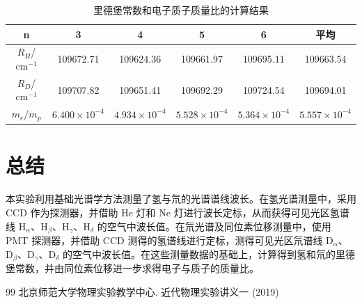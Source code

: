 \documentclass[a4paper, 1.5lines]{ctexart}
\begin{document}
    \begin{table}[h!]
        \centering
        \caption{里德堡常数和电子质子质量比的计算结果}
        \label{data:000}
        
        \begin{tabular}{|c|c|c|c|c|c|}
            \hline
            n & 3 & 4 & 5 & 6 & 平均 \\
            \hline
            $R_H$/$\mathrm{cm}^{-1}$  & 109672.71 & 109624.36 & 109661.97 & 109695.11 & 109663.54 \\
            \hline
            $R_D$/$\mathrm{cm}^{-1}$ & 109707.82 & 109651.41 & 109692.29 & 109724.54 & 109694.01 \\
            \hline
            $m_e/m_p$ & $6.400\times 10^{-4}$ & $4.934\times 10^{-4}$ & $5.528\times 10^{-4}$ & $5.364\times 10^{-4}$ & $5.557\times 10^{-4}$ \\
            \hline
        \end{tabular}
        
    \end{table}
    \section{总结}
        本实验利用基础光谱学方法测量了氢与氘的光谱谱线波长。在氢光谱测量中，采用 CCD 作为探测器，并借助 He 灯和 Ne 灯进行波长定标，从而获得可见光区氢谱线 $\mathrm{H}_\alpha$、$\mathrm{H}_\beta$、$\mathrm{H}_\gamma$、$\mathrm{H}_\delta$ 的空气中波长值。在氘光谱及同位素位移测量中，使用 PMT 探测器，并借助 CCD 测得的氢谱线进行定标，测得可见光区氘谱线 $\mathrm{D}_\alpha$、$\mathrm{D}_\beta$、$\mathrm{D}_\gamma$、$\mathrm{D}_\delta$ 的空气中波长值。在这些测量数据的基础上，计算得到氢和氘的里德堡常数，并由同位素位移进一步求得电子与质子的质量比。
    \begin{thebibliography}{99}
        北京师范大学物理实验教学中心. 近代物理实验讲义一 (2019)
    \end{thebibliography}

    
\end{document}
